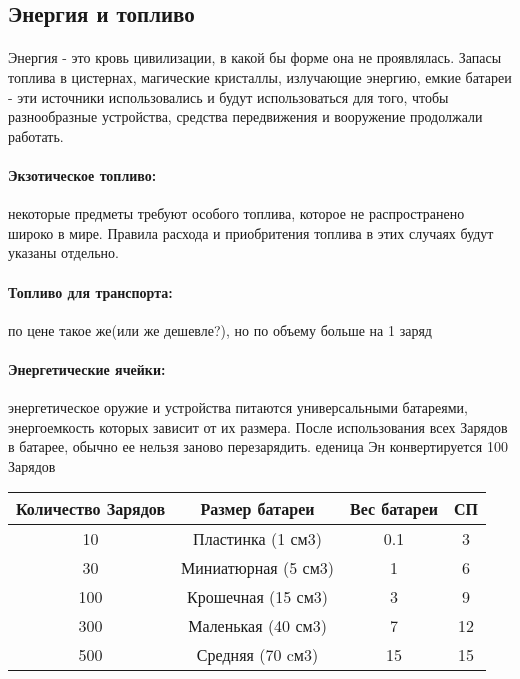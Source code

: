 \subsection{Энергия и топливо}
\paragraph{}
Энергия - это кровь цивилизации, в какой бы форме она не проявлялась. Запасы топлива в цистернах, магические кристаллы, излучающие энергию, емкие батареи - эти источники использовались и будут использоваться для того, чтобы разнообразные устройства, средства передвижения и вооружение продолжали работать.

\paragraph{Экзотическое топливо:} некоторые предметы требуют особого топлива, которое не распространено широко в мире. Правила расхода и приобритения топлива в этих случаях будут указаны отдельно.

\paragraph{Топливо для транспорта:} \tbd по цене такое же(или же дешевле?), но по объему больше на 1 заряд

\paragraph{Энергетические ячейки:} энергетическое оружие и устройства питаются универсальными батареями, энергоемкость которых зависит от их размера. После использования всех Зарядов в батарее, обычно ее нельзя заново перезарядить.
\newline {} еденица Эн конвертируется 100 Зарядов
\begin{center}
\begin{tabular}{|c|c|c|c|}
\hline
Количество Зарядов & Размер батареи & Вес батареи & СП \\ \hline
10 & Пластинка (1 см3) & 0.1 & 3 \\ \hline
30 & Миниатюрная (5 см3) & 1 & 6 \\ \hline
100 & Крошечная (15 см3) & 3 & 9 \\ \hline
300 & Маленькая (40 см3) & 7 & 12 \\ \hline
500 & Средняя (70 cм3) & 15 & 15 \\ \hline
\end{tabular}
\end{center}
